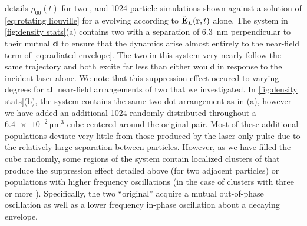  details $\rho_{00}(t)$ for two-, and 1024-particle simulations shown against a solution of \cref{eq:rotating liouville} for a \qd{} evolving according to $\tilde{\vb{E}}_L(\vb{r}, t)$ alone.
The system in \cref{fig:density stats}(a) contains two \qds{} with a separation of \SI{6.3}{\nano\meter} perpendicular to their mutual $\vb{d}$ to ensure that the dynamics arise almost entirely to the near-field term of \cref{eq:radiated envelope}.
The two \qds{} in this system very nearly follow the same trajectory and both excite far less than either would in response to the incident laser alone.
We note that this suppression effect occured to varying degrees for all near-field arrangements of two \qds{} that we investigated.
In \cref{fig:density stats}(b), the system contains the same two-dot arrangement as in (a), however we have added an additional 1024 \qds{} randomly distributed throughout a $\SI{6.4e-2}{\micro\meter\cubed}$ cube centered around the original pair.
Most of these additional \qd{} populations deviate very little from those produced by the laser-only pulse due to the relatively large separation between particles.
However, as we have filled the cube randomly, some regions of the system contain localized clusters of \qds{} that produce the suppression effect detailed above (for two adjacent particles) or populations with higher frequency oscillations (in the case of clusters with three or more \qds{}).
Specifically, the two ``original'' \qds{} acquire a mutual out-of-phase oscillation as well as a lower frequency in-phase oscillation about a decaying envelope.

